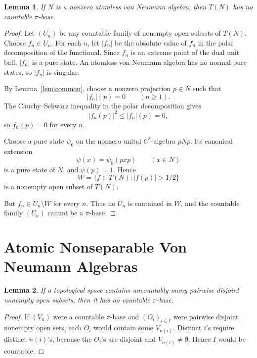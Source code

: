 \documentclass[11pt]{article}
\newtheorem{lemma}{Lemma}
\begin{document}
\begin{lemma}
\label{lem:atomless-transition}
If \(N\) is a nonzero atomless von Neumann algebra, then \(T(N)\) has no
countable \(\pi\)-base.
\end{lemma}

\begin{proof}
Let \((U_n)\) be any countable family of nonempty open subsets of \(T(N)\).
Choose \(f_n\in U_n\).  For each \(n\), let \(|f_n|\) be the absolute value
of \(f_n\) in the polar decomposition of the functional.  Since \(f_n\) is an
extreme point of the dual unit ball, \(|f_n|\) is a pure state.  An atomless
von Neumann algebra has no normal pure states, so \(|f_n|\) is singular.

By Lemma~\ref{lem:common}, choose a nonzero projection \(p\in N\) such that
\[
        |f_n|(p)=0\qquad(n\ge1).
\]
The Cauchy--Schwarz inequality in the polar decomposition gives
\[
        |f_n(p)|^2\le |f_n|(p)=0,
\]
so \(f_n(p)=0\) for every \(n\).

Choose a pure state \(\psi_0\) on the nonzero unital \(C^*\)-algebra
\(pNp\).  Its canonical extension
\[
        \psi(x)=\psi_0(pxp)\qquad(x\in N)
\]
is a pure state of \(N\), and \(\psi(p)=1\).  Hence
\[
        W=\{f\in T(N): |f(p)|>1/2\}
\]
is a nonempty open subset of \(T(N)\).

But \(f_n\in U_n\setminus W\) for every \(n\).  Thus no \(U_n\) is contained
in \(W\), and the countable family \((U_n)\) cannot be a \(\pi\)-base.
\end{proof}

\section*{Atomic Nonseparable Von Neumann Algebras}

\begin{lemma}
\label{lem:disjoint}
If a topological space contains uncountably many pairwise disjoint nonempty
open subsets, then it has no countable \(\pi\)-base.
\end{lemma}

\begin{proof}
If \((V_n)\) were a countable \(\pi\)-base and \((O_i)_{i\in I}\) were
pairwise disjoint nonempty open sets, each \(O_i\) would contain some
\(V_{n(i)}\).  Distinct \(i\)'s require distinct \(n(i)\)'s, because the
\(O_i\)'s are disjoint and \(V_{n(i)}\ne\emptyset\).  Hence \(I\) would be
countable.
\end{proof}
\end{document}
